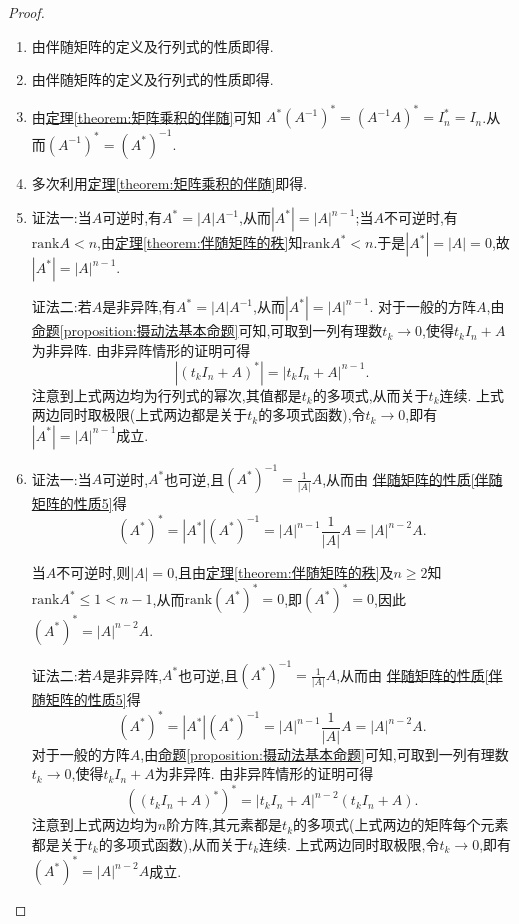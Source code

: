\documentclass[../../main.tex]{subfiles}
\begin{document}
\begin{proof}
\begin{enumerate}
\item 由伴随矩阵的定义及行列式的性质即得.

\item 由伴随矩阵的定义及行列式的性质即得.

\item 由\hyperref[theorem:矩阵乘积的伴随]{定理\ref{theorem:矩阵乘积的伴随}}可知
$A^*\left( A^{-1} \right) ^*=\left( A^{-1}A \right) ^*=I_{n}^{*}=I_n$.从而$(A^{-1})^* = (A^*)^{-1}$.

\item 多次利用\hyperref[theorem:矩阵乘积的伴随]{定理\ref{theorem:矩阵乘积的伴随}}即得.

\item {\color{blue}证法一:}当\(A\)可逆时,有\(A^* = |A|A^{-1}\),从而\(|A^*| = |A|^{n - 1}\);当\(A\)不可逆时,有$\mathrm{rank}A<n$,由\hyperref[theorem:伴随矩阵的秩]{定理\ref{theorem:伴随矩阵的秩}}知$\mathrm{rank}A^*<n$.于是\(|A^*| = |A| = 0\),故\(|A^*| = |A|^{n - 1}\).

{\color{blue}证法二:}若\(A\)是非异阵,有\(A^* = |A|A^{-1}\),从而\(|A^*| = |A|^{n - 1}\). 对于一般的方阵\(A\),由\hyperref[proposition:摄动法基本命题]{命题\ref{proposition:摄动法基本命题}}可知,可取到一列有理数\(t_k\rightarrow0\),使得\(t_kI_n + A\)为非异阵. 由非异阵情形的证明可得
\[
|(t_kI_n + A)^*| = |t_kI_n + A|^{n - 1}.
\]
注意到上式两边均为行列式的幂次,其值都是\(t_k\)的多项式,从而关于\(t_k\)连续. 上式两边同时取极限(上式两边都是关于$t_k$的多项式函数),令\(t_k\rightarrow0\),即有\(|A^*| = |A|^{n - 1}\)成立.

\item {\color{blue}证法一:}当\(A\)可逆时,\(A^*\)也可逆,且\((A^*)^{-1} = \frac{1}{|A|}A\),从而由 \hyperref[伴随矩阵的性质5]{伴随矩阵的性质\ref{伴随矩阵的性质5}}得
\[
(A^*)^* = |A^*|(A^*)^{-1} = |A|^{n - 1}\frac{1}{|A|}A = |A|^{n - 2}A.
\]

当\(A\)不可逆时,则\(|A| = 0\),且由\hyperref[theorem:伴随矩阵的秩]{定理\ref{theorem:伴随矩阵的秩}}及$n\geqslant  2$知\(\mathrm{rank}A^* \leqslant  1<n-1\),从而\(\mathrm{rank}(A^*)^* = 0\),即\((A^*)^* = 0\),因此\((A^*)^* = |A|^{n - 2}A\).

{\color{blue}证法二:}若\(A\)是非异阵,\(A^*\)也可逆,且\((A^*)^{-1} = \frac{1}{|A|}A\),从而由 \hyperref[伴随矩阵的性质5]{伴随矩阵的性质\ref{伴随矩阵的性质5}}得
\[
(A^*)^* = |A^*|(A^*)^{-1} = |A|^{n - 1}\frac{1}{|A|}A = |A|^{n - 2}A.
\]
对于一般的方阵\(A\),由\hyperref[proposition:摄动法基本命题]{命题\ref{proposition:摄动法基本命题}}可知,可取到一列有理数\(t_k\rightarrow0\),使得\(t_kI_n + A\)为非异阵. 由非异阵情形的证明可得
\[
((t_kI_n + A)^*)^* = |t_kI_n + A|^{n - 2}(t_kI_n + A).
\]
注意到上式两边均为\(n\)阶方阵,其元素都是\(t_k\)的多项式(上式两边的矩阵每个元素都是关于$t_k$的多项式函数),从而关于\(t_k\)连续. 上式两边同时取极限,令\(t_k\rightarrow0\),即有\((A^*)^* = |A|^{n - 2}A\)成立. 
\end{enumerate}
\end{proof}
\end{document}

